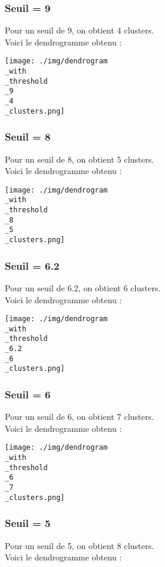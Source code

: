 \documentclass{article}
\begin{document}
\subsubsection*{Seuil = 9}
Pour un seuil de 9, on obtient 4 clusters.\\
Voici le dendrogramme obtenu :

\begin{center}
    \texttt{[image: ./img/dendrogram\\\_with\\\_threshold\\\_9\\\_4\\\_clusters.png]}
\end{center}

\subsubsection*{Seuil = 8}
Pour un seuil de 8, on obtient 5 clusters.\\
Voici le dendrogramme obtenu :

\begin{center}
    \texttt{[image: ./img/dendrogram\\\_with\\\_threshold\\\_8\\\_5\\\_clusters.png]}
\end{center}

\subsubsection*{Seuil = 6.2}
Pour un seuil de 6.2, on obtient 6 clusters.\\
Voici le dendrogramme obtenu :

\begin{center}
    \texttt{[image: ./img/dendrogram\\\_with\\\_threshold\\\_6.2\\\_6\\\_clusters.png]}
\end{center}

\subsubsection*{Seuil = 6}
Pour un seuil de 6, on obtient 7 clusters.\\
Voici le dendrogramme obtenu :

\begin{center}
    \texttt{[image: ./img/dendrogram\\\_with\\\_threshold\\\_6\\\_7\\\_clusters.png]}
\end{center}

\subsubsection*{Seuil = 5}
Pour un seuil de 5, on obtient 8 clusters.\\
Voici le dendrogramme obtenu :
\end{document}
